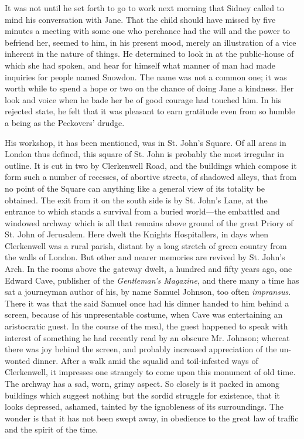 It was not until he set forth to go to work next morning that Sidney
called to mind his conversation with Jane. That the child should
{\protect\hypertarget{121}{}{}}have missed by five minutes a meeting
with some one who perchance had the will and the power to befriend her,
seemed to him, in his present mood, merely an illustration of a vice
inherent in the nature of things. He determined to look in at the
public-house of which she had spoken, and hear for himself what manner
of man had made inquiries for people named Snowdon. The name was not a
common one; it was worth while to spend a hope or two on the chance of
doing Jane a kindness. Her look and voice when he bade her be of good
courage had touched him. In his rejected state, he felt that it was
pleasant to earn gratitude even from so humble a being as the Peckovers'
drudge.

His workshop, it has been mentioned, was in St. John's Square. Of all
areas in London thus defined, this square of St. John is probably the
most irregular in outline. It is cut in two by Clerkenwell Road, and the
buildings which compose it form such a number of recesses, of abortive
streets, of shadowed alleys, that from no point of the Square can
{\protect\hypertarget{122}{}{}}anything like a general view of its
totality be obtained. The exit from it on the south side is by St.
John's Lane, at the entrance to which stands a survival from a buried
world---the embattled and windowed archway which is all that remains
above ground of the great Priory of St. John of Jerusalem. Here dwelt
the Knights Hospitallers, in days when Clerkenwell was a rural parish,
distant by a long stretch of green country from the walls of London. But
other and nearer memories are revived by St. John's Arch. In the rooms
above the gateway dwelt, a hundred and fifty years ago, one Edward Cave,
publisher of the \emph{Gentleman's Magazine}, and there many a time has
sat a journeyman author of his, by name Samuel Johnson, too often
\emph{impransus}. There it was that the said Samuel once had his dinner
handed to him behind a screen, because of his unpresentable costume,
when Cave was entertaining an aristocratic guest. In the course of the
meal, the guest happened to speak with interest of something he had
recently read by an obscure Mr. Johnson;
{\protect\hypertarget{123}{}{}}whereat there was joy behind the screen,
and probably increased appreciation of the un-wonted dinner. After a
walk amid the squalid and toil-infested ways of Clerkenwell, it
impresses one strangely to come upon this monument of old time. The
archway has a sad, worn, grimy aspect. So closely is it packed in among
buildings which suggest nothing but the sordid struggle for existence,
that it looks depressed, ashamed, tainted by the ignobleness of its
surroundings. The wonder is that it has not been swept away, in
obedience to the great law of traffic and the spirit of the time.

